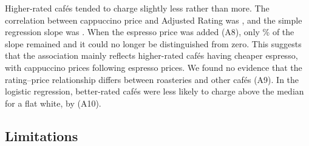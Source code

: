 \documentclass[11pt,a4paper]{article}
\begin{document}
Higher-rated caf\'es tended to charge slightly less rather than more. The correlation between cappuccino price and Adjusted Rating was \ASixEst{}, and the simple regression slope was \ASevenEst{}. When the espresso price was added (A8), only \AEightRemain{}\% of the slope remained and it could no longer be distinguished from zero. This suggests that the association mainly reflects higher-rated caf\'es having cheaper espresso, with cappuccino prices following espresso prices. We found no evidence that the rating--price relationship differs between roasteries and other caf\'es (A9). In the logistic regression, better-rated caf\'es were less likely to charge above the median for a flat white, by \ATenEst{} (A10).

\FloatBarrier
\subsection{Limitations}
\end{document}
